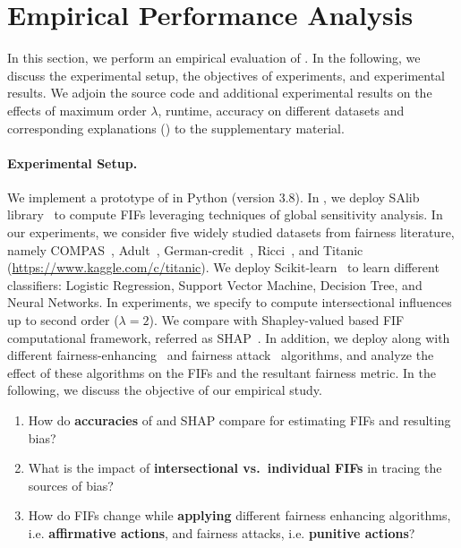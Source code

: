 \section{Empirical Performance Analysis}\label{sec:experiments}
In this section, we perform an empirical evaluation of {\fairXplainer}. In the following, we discuss the experimental setup, the objectives of experiments, and experimental results. { We adjoin the source code and additional experimental results on the effects of maximum order $\lambda$, runtime, accuracy on different datasets and corresponding explanations () to the supplementary material.}

\paragraph{Experimental Setup.} We implement a prototype of {\fairXplainer} in Python (version $ 3.8 $). In {\fairXplainer}, we deploy SAlib library~\cite{Herman2017} to compute FIFs leveraging techniques of global sensitivity analysis. In our experiments, we consider five widely studied datasets from fairness literature, namely COMPAS~\cite{angwin2016machine}, Adult~\cite{DK2017uci}, German-credit~\cite{DK2017}, Ricci~\cite{mcginley2010ricci}, and Titanic (\url{https://www.kaggle.com/c/titanic}). We deploy Scikit-learn~\cite{scikit-learn} to learn different classifiers: Logistic Regression, Support Vector Machine, Decision Tree, and Neural Networks. In experiments, we specify {\fairXplainer} to compute intersectional influences up to second order ($ \lambda = 2 $). We compare {\fairXplainer} with Shapley-valued based FIF computational framework, referred as SHAP~\cite{lundberg2020explaining}. In addition, we deploy {\fairXplainer} along with different fairness-enhancing~\cite{kamiran2012data} and fairness attack~\cite{solans2020poisoning} algorithms, and analyze the effect of these algorithms on the FIFs and the resultant fairness metric. In the following, we discuss the objective of our empirical study. 

\begin{enumerate}
	\item How do \textbf{accuracies} of {\fairXplainer} and SHAP compare for estimating FIFs and resulting bias?
	\item What is the impact of\textbf{ intersectional vs.\ individual FIFs} in tracing the sources of bias?
    \item How do FIFs change while \textbf{applying} different fairness enhancing algorithms, i.e. \textbf{affirmative actions}, and fairness attacks, i.e. \textbf{punitive actions}?
\end{enumerate}

